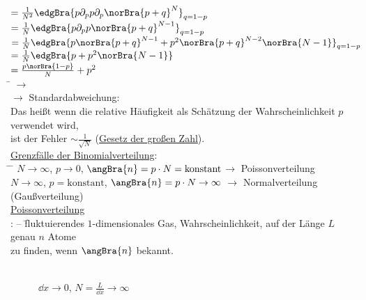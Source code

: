 \begin{tabbing}
\>\>$=\frac1{N^2} \edgBra{p\partial_p p\partial_p \norBra{p+q}^N}_{q=1-p}$\\
\>\>$=\frac1N \edgBra{p \partial_p p \norBra{p+q}^{N-1}}_{q = 1-p}$\\
\>\>$=\frac1N \edgBra{p\norBra{p+q}^{N-1} + p^2 \norBra{p+q}^{N-2}\norBra{N-1}}_{q=1-p}$\\
\>\>$=\frac1N \edgBra{p + p^2\norBra{N-1}}$\\
\>\>$=\frac{p\norBra{1-p}}{N} + p^2$\\
\hspace{4em} \= \kill
$\rightarrow$\> \\
$\rightarrow$\> Standardabweichung: \\
Das heißt wenn die relative Häufigkeit als Schätzung der Wahrscheinlichkeit $p$ verwendet wird,\\ ist der Fehler $\sim \frac1{\sqrt{N}}$ (\glqq\underline{Gesetz der großen Zahl}\grqq).\\
\underline{Grenzfälle der Binomialverteilung}:\\
\hspace{4em} \= \hspace{20em} \= \kill
\>$N\to\infty$, $p\to 0$, $\angBra{n} = p\cdot N =\text{konstant}$\>$\rightarrow$ Poissonverteilung\\
\>$N\to\infty$, $p=\text{konstant}$, $\angBra{n} = p\cdot N\to \infty$\> $\rightarrow$ Normalverteilung (Gaußverteilung)\\
\underline{Poissonverteilung}\\
:  -- \= fluktuierendes $1$-dimensionales Gas, Wahrscheinlichkeit, auf der Länge $L$ genau $n$ Atome\\\> zu finden, wenn $\angBra{n}$ bekannt.
\end{tabbing}
\begin{figure}[H]
  \centering
  \\
  $\dd{x}\to 0$, $N = \frac{L}{\dd{x}}\to\infty$
\end{figure}

